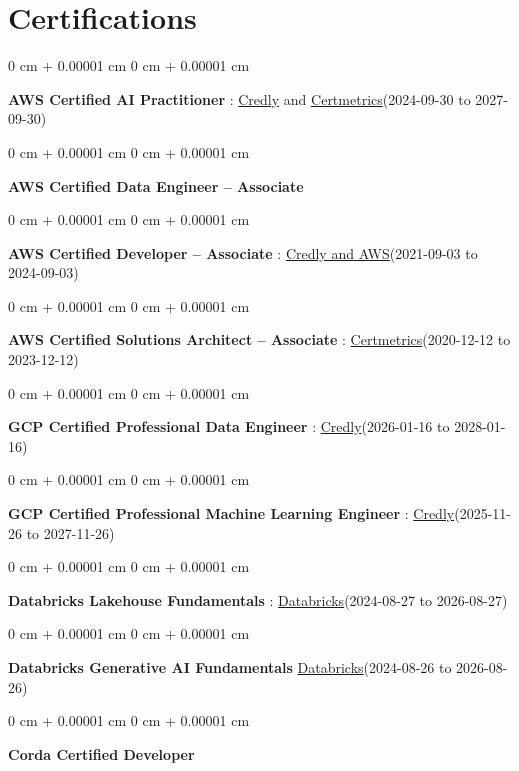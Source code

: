 \documentclass[10pt, letterpaper]{article}
\newenvironment{onecolentry}{
    \begin{adjustwidth}{
        0 cm + 0.00001 cm
    }{
        0 cm + 0.00001 cm
    }
}{
    \end{adjustwidth}
} %
\begin{document}
    \vspace{2 pt }
    \section{Certifications}
        \vspace{2 pt }
        \begin{samepage}
            \begin{onecolentry}
                \textbf{AWS Certified AI Practitioner} : \href{https://www.credly.com/badges/451b7ba5-8be1-4a8e-bbec-ade26627a6b6/public_url}{Credly} and \href{https://cp.certmetrics.com/amazon/en/public/verify/credential/495f0d9853874bf9a33c17f8e89ce131}{Certmetrics}(2024-09-30 to 2027-09-30)
            \end{onecolentry}
            \begin{onecolentry}
                \textbf{AWS Certified Data Engineer – Associate}
            \end{onecolentry}
            \begin{onecolentry}
                \textbf{AWS Certified Developer – Associate} : \href{https://www.credly.com/badges/b8106fbd-d3d1-4204-8cdf-e708798fd582/public_url}{Credly and AWS}(2021-09-03  to 2024-09-03)
            \end{onecolentry}
            \begin{onecolentry}
                \textbf{AWS Certified Solutions Architect – Associate} : \href{https://cp.certmetrics.com/amazon/en/public/verify/credential/SNBY48EBJJVE1SWX}{Certmetrics}(2020-12-12 to 2023-12-12)
            \end{onecolentry}
            \begin{onecolentry}
                \textbf{GCP Certified Professional Data Engineer} : \href{https://www.credly.com/badges/977e96d9-12e7-4f6c-b8a7-df71fb7153b8/public_url}{Credly}(2026-01-16 to 2028-01-16)
            \end{onecolentry}
            \begin{onecolentry}
                \textbf{GCP Certified Professional Machine Learning Engineer} : \href{https://www.credly.com/badges/a6965347-09ea-4d8f-b398-0e151407160d/public_url}{Credly}(2025-11-26 to 2027-11-26)
            \end{onecolentry}
            \begin{onecolentry}
                \textbf{Databricks Lakehouse Fundamentals} : \href{https://scl.io/FXGKS0u}{Databricks}(2024-08-27 to 2026-08-27)
            \end{onecolentry}
            \begin{onecolentry}
                \textbf{Databricks Generative AI Fundamentals} \href{https://sgq.io/3uIFGNi}{Databricks}(2024-08-26 to 2026-08-26)
            \end{onecolentry}
            \begin{onecolentry}
                \textbf{Corda Certified Developer}
            \end{onecolentry}
        \end{samepage}
\end{document}
